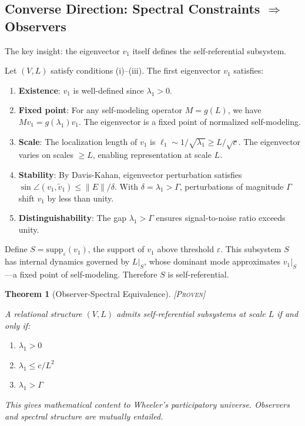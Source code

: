 \documentclass[11pt,a4paper]{article}
\newtheorem{theorem}{Theorem}[section]
\theoremstyle{definition}
\theoremstyle{remark}
\begin{document}
\subsection{Converse Direction: Spectral Constraints $\Rightarrow$ Observers}

The key insight: the eigenvector $v_1$ itself defines the self-referential subsystem.

Let $(V, L)$ satisfy conditions (i)--(iii). The first eigenvector $v_1$ satisfies:
\begin{enumerate}
    \item[(a)] \textbf{Existence}: $v_1$ is well-defined since $\lambda_1 > 0$.

    \item[(b)] \textbf{Fixed point}: For any self-modeling operator $M = g(L)$, we have $Mv_1 = g(\lambda_1)v_1$. The eigenvector is a fixed point of normalized self-modeling.

    \item[(c)] \textbf{Scale}: The localization length of $v_1$ is $\ell_1 \sim 1/\sqrt{\lambda_1} \geq L/\sqrt{c}$. The eigenvector varies on scales $\geq L$, enabling representation at scale $L$.

    \item[(d)] \textbf{Stability}: By Davis-Kahan, eigenvector perturbation satisfies $\sin\angle(v_1, \tilde{v}_1) \leq \|E\|/\delta$. With $\delta = \lambda_1 > \Gamma$, perturbations of magnitude $\Gamma$ shift $v_1$ by less than unity.

    \item[(e)] \textbf{Distinguishability}: The gap $\lambda_1 > \Gamma$ ensures signal-to-noise ratio exceeds unity.
\end{enumerate}

Define $S = \text{supp}_\varepsilon(v_1)$, the support of $v_1$ above threshold $\varepsilon$. This subsystem $S$ has internal dynamics governed by $L|_S$, whose dominant mode approximates $v_1|_S$---a fixed point of self-modeling. Therefore $S$ is self-referential.

\begin{theorem}[Observer-Spectral Equivalence]
\textsc{[Proven]}

A relational structure $(V, L)$ admits self-referential subsystems at scale $L$ if and only if:
\begin{enumerate}
    \item[(i)] $\lambda_1 > 0$
    \item[(ii)] $\lambda_1 \leq c/L^2$
    \item[(iii)] $\lambda_1 > \Gamma$
\end{enumerate}

This gives mathematical content to Wheeler's participatory universe. Observers and spectral structure are mutually entailed.
\end{theorem}
\end{document}
